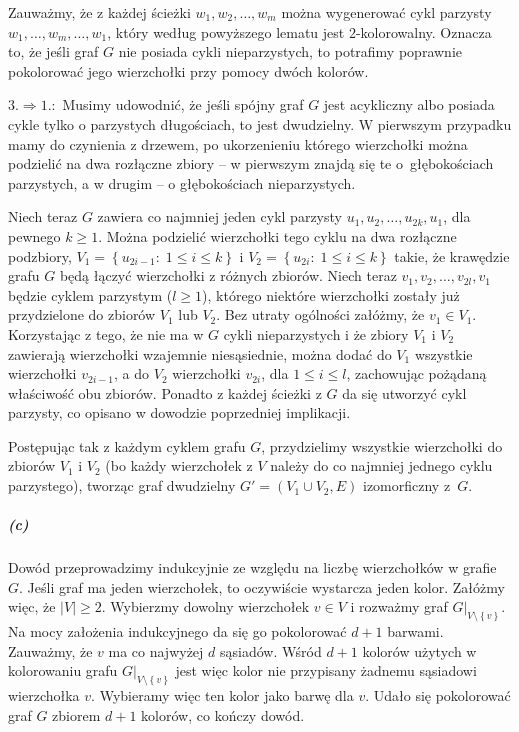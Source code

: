 Zauważmy, że z każdej ścieżki $w_1,w_2,\dots,w_m$ można wygenerować cykl parzysty $w_1,\dots,w_m,\dots,w_1$, który według powyższego lematu jest $2$-kolorowalny. Oznacza to, że jeśli graf $G$ nie posiada cykli nieparzystych, to potrafimy poprawnie pokolorować jego wierzchołki przy pomocy dwóch kolorów.
\bigskip

$3.\Rightarrow 1.\!\!:$ Musimy udowodnić, że jeśli spójny graf $G$ jest acykliczny albo posiada cykle tylko o parzystych długościach, to jest dwudzielny. W pierwszym przypadku mamy do czynienia z drzewem, po ukorzenieniu którego wierzchołki można podzielić na dwa rozłączne zbiory -- w pierwszym znajdą się te o~głębokościach parzystych, a w drugim -- o głębokościach nieparzystych.

Niech teraz $G$ zawiera co najmniej jeden cykl parzysty $u_1,u_2,\dots,u_{2k},u_1$, dla pewnego $k\ge 1$. Można podzielić wierzchołki tego cyklu na dwa rozłączne podzbiory, $V_1 = \left\{ u_{2i-1}:\;1\le i\le k\right\}$ i $V_2 = \left\{ u_{2i}:\;1\le i\le k\right\}$ takie, że krawędzie grafu $G$ będą łączyć wierzchołki z różnych zbiorów. Niech teraz $v_1,v_2,\dots,v_{2l},v_1$ będzie cyklem parzystym ($l\ge 1$), którego niektóre wierzchołki zostały już przydzielone do zbiorów $V_1$ lub $V_2$. Bez utraty ogólności załóżmy, że $v_1\in V_1$. Korzystając z tego, że nie ma w $G$ cykli nieparzystych i że zbiory $V_1$ i $V_2$ zawierają wierzchołki wzajemnie niesąsiednie, można dodać do $V_1$ wszystkie wierzchołki $v_{2i-1}$, a do $V_2$ wierzchołki $v_{2i}$, dla $1\le i\le l$, zachowując pożądaną właściwość obu zbiorów. Ponadto z każdej ścieżki z $G$ da się utworzyć cykl parzysty, co opisano w dowodzie poprzedniej implikacji.

Postępując tak z każdym cyklem grafu $G$, przydzielimy wszystkie wierzchołki do zbiorów $V_1$ i $V_2$ (bo każdy wierzchołek z $V$ należy do co najmniej jednego cyklu parzystego), tworząc graf dwudzielny $G'=(V_1\cup V_2,E)$ izomorficzny z~$G$.

\subparagraph{(c)}
Dowód przeprowadzimy indukcyjnie ze względu na liczbę wierzchołków w grafie $G$. Jeśli graf ma jeden wierzchołek, to oczywiście wystarcza jeden kolor. Załóżmy więc, że $|V|\ge 2$. Wybierzmy dowolny wierzchołek $v\in V$ i rozważmy graf $G|_{V\setminus\left\{v\right\}}$. Na mocy założenia indukcyjnego da się go pokolorować $d+1$ barwami. Zauważmy, że $v$ ma co najwyżej $d$ sąsiadów. Wśród $d+1$ kolorów użytych w kolorowaniu grafu $G|_{V\setminus\left\{v\right\}}$ jest więc kolor nie przypisany żadnemu sąsiadowi wierzchołka $v$. Wybieramy więc ten kolor jako barwę dla $v$. Udało się pokolorować graf $G$ zbiorem $d+1$ kolorów, co kończy dowód.


